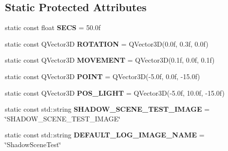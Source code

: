 \subsection*{Static Protected Attributes}
\begin{DoxyCompactItemize}
\item 
\mbox{\label{class_unit_test_1_1_c_translucent_shadows_scene_test_abb2130122cc7cf5e68dcd368eb320c98}} 
static const float {\bfseries S\+E\+CS} = 50.\+0f
\item 
\mbox{\label{class_unit_test_1_1_c_translucent_shadows_scene_test_a1044c4041742e30c8ec6a3144f4291f1}} 
static const Q\+Vector3D {\bfseries R\+O\+T\+A\+T\+I\+ON} = Q\+Vector3D(0.\+0f, 0.\+3f, 0.\+0f)
\item 
\mbox{\label{class_unit_test_1_1_c_translucent_shadows_scene_test_a842efa86b828ae9ab53588d83c0a2b48}} 
static const Q\+Vector3D {\bfseries M\+O\+V\+E\+M\+E\+NT} = Q\+Vector3D(0.\+1f, 0.\+0f, 0.\+1f)
\item 
\mbox{\label{class_unit_test_1_1_c_translucent_shadows_scene_test_a34f38c9de349b2f095e2f929a0d78bcd}} 
static const Q\+Vector3D {\bfseries P\+O\+I\+NT} = Q\+Vector3D(-\/5.\+0f, 0.\+0f, -\/15.\+0f)
\item 
\mbox{\label{class_unit_test_1_1_c_translucent_shadows_scene_test_a2282022aa89bf4961a03b522b0b33b97}} 
static const Q\+Vector3D {\bfseries P\+O\+S\+\_\+\+L\+I\+G\+HT} = Q\+Vector3D(-\/5.\+0f, 10.\+0f, -\/15.\+0f)
\item 
\mbox{\label{class_unit_test_1_1_c_translucent_shadows_scene_test_ad9a092c5603f7f7572c9bab77d525345}} 
static const std\+::string {\bfseries S\+H\+A\+D\+O\+W\+\_\+\+S\+C\+E\+N\+E\+\_\+\+T\+E\+S\+T\+\_\+\+I\+M\+A\+GE} = \char`\"{}S\+H\+A\+D\+O\+W\+\_\+\+S\+C\+E\+N\+E\+\_\+\+T\+E\+S\+T\+\_\+\+I\+M\+A\+GE\char`\"{}
\item 
\mbox{\label{class_unit_test_1_1_c_translucent_shadows_scene_test_a1dd2b0bdbdfbebbdd6b13897f5fb811f}} 
static const std\+::string {\bfseries D\+E\+F\+A\+U\+L\+T\+\_\+\+L\+O\+G\+\_\+\+I\+M\+A\+G\+E\+\_\+\+N\+A\+ME} = \char`\"{}Shadow\+Scene\+Test\char`\"{}
\end{DoxyCompactItemize}


